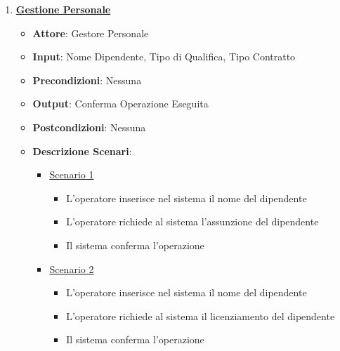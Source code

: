 \begin{enumerate}
    \item \uline {{\bf Gestione Personale}}
    \begin{itemize} 
        \item {\bf Attore}: Gestore Personale
        \item {\bf Input}: Nome Dipendente, Tipo di Qualifica, Tipo Contratto
        \item {\bf Precondizioni}: Nessuna
        \item {\bf Output}: Conferma Operazione Eseguita
        \item {\bf Postcondizioni}: Nessuna
        \item {\bf Descrizione Scenari}:
        \begin{itemize}
            \item \uline{Scenario 1}
            \begin{itemize}
                \item L'operatore inserisce nel sistema il nome del dipendente
                \item L'operatore richiede al sistema l'assunzione del dipendente
                \item Il sistema conferma l'operazione
            \end{itemize}
            \item \uline{Scenario 2}
            \begin{itemize}
                \item L'operatore inserisce nel sistema il nome del dipendente
                \item L'operatore richiede al sistema il licenziamento del dipendente
                \item Il sistema conferma l'operazione
            \end{itemize}
        \end{itemize}     
    \end{itemize}


\end{enumerate}
